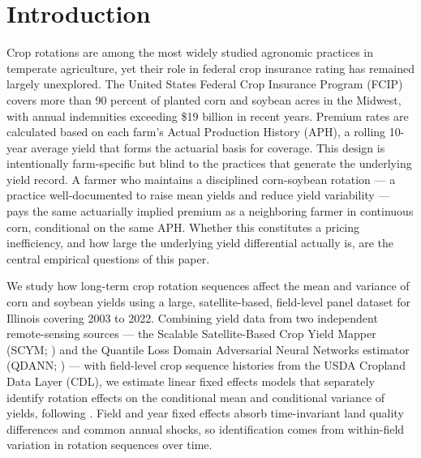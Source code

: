 \documentclass[11pt,letterpaper]{article}
\theoremstyle{remark}
\theoremstyle{plain}
\theoremstyle{definition}
\begin{document}
\begin{abstract}
	\end{abstract}

    \newpage
	
\section{\label{sec:intro}Introduction}

Crop rotations are among the most widely studied agronomic practices in temperate agriculture, yet their role in federal crop insurance rating has remained largely unexplored. The United States Federal Crop Insurance Program (FCIP) covers more than 90 percent of planted corn and soybean acres in the Midwest, with annual indemnities exceeding \$19 billion in recent years. Premium rates are calculated based on each farm's Actual Production History (APH), a rolling 10-year average yield that forms the actuarial basis for coverage. This design is intentionally farm-specific but blind to the practices that generate the underlying yield record. A farmer who maintains a disciplined corn-soybean rotation — a practice well-documented to raise mean yields and reduce yield variability — pays the same actuarially implied premium as a neighboring farmer in continuous corn, conditional on the same APH. Whether this constitutes a pricing inefficiency, and how large the underlying yield differential actually is, are the central empirical questions of this paper.

We study how long-term crop rotation sequences affect the mean and variance of corn and soybean yields using a large, satellite-based, field-level panel dataset for Illinois covering 2003 to 2022. Combining yield data from two independent remote-sensing sources — the Scalable Satellite-Based Crop Yield Mapper (SCYM; \cite{lobell2015}) and the Quantile Loss Domain Adversarial Neural Networks estimator (QDANN; \cite{Ma2024}) — with field-level crop sequence histories from the USDA Cropland Data Layer (CDL), we estimate linear fixed effects models that separately identify rotation effects on the conditional mean and conditional variance of yields, following \cite{Just1979}. Field and year fixed effects absorb time-invariant land quality differences and common annual shocks, so identification comes from within-field variation in rotation sequences over time.
\end{document}
